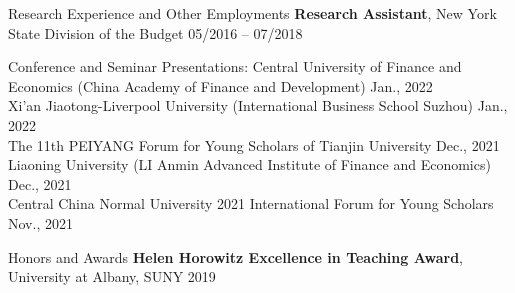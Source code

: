 \documentclass{resume_liang} %
\begin{document}
\begin{rSection}{Research Experience and Other Employments}
{\bf Research Assistant}{, New York State Division of the Budget} \hfill {05/2016 -- 07/2018}
\vspace{0.1cm}\\
\end{rSection}
\bigskip  



\begin{rSection}{Conference and Seminar Presentations:} 
{Central University of Finance and Economics (China Academy of Finance and Development)} \hfill{Jan., 2022}  
\vspace{0.1cm}\\
{Xi'an Jiaotong-Liverpool University (International Business School Suzhou)} \hfill{Jan., 2022}  
\vspace{0.1cm}\\ 
{The 11th PEIYANG Forum for Young Scholars of Tianjin University} \hfill{Dec., 2021}  
\vspace{0.1cm}\\ 
{Liaoning University (LI Anmin Advanced Institute of Finance and Economics)} \hfill{Dec., 2021}  
\vspace{0.1cm}\\ 
{Central China Normal University 2021 International Forum for Young Scholars} \hfill{Nov., 2021}  
\vspace{0.1cm}\\
\end{rSection}
\bigskip  



\begin{rSection}{Honors and Awards} 
{\bf Helen Horowitz Excellence in Teaching Award}{, University at Albany, SUNY} \hfill{2019}  
\vspace{0.1cm} \\
\end{rSection}
\bigskip  
\end{document}
